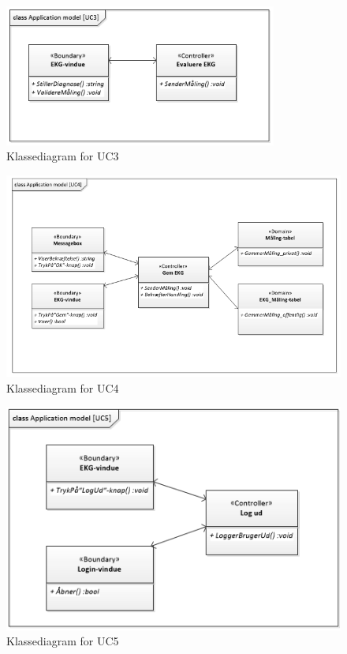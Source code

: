 \begin{figure}[H]
	\centering
	\includegraphics[width=0.8\textwidth]{Figurer/Snip20150429_23}
	\caption{Klassediagram for UC3}
\end{figure}

\begin{figure}[H]
	\centering
	\includegraphics[width=1\textwidth]{Figurer/Snip20150525_20}
	\caption{Klassediagram for UC4}
\end{figure}

\begin{figure}[H]
	\centering
	\includegraphics[width=1\textwidth]{Figurer/Snip20150429_25}
	\caption{Klassediagram for UC5}
\end{figure}

